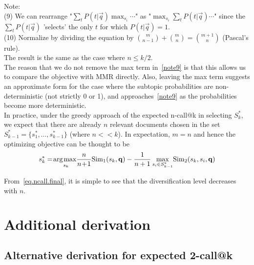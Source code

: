\noindent
Note: \\
(9) We can rearrange "$\sum_t P(t|\vec{q}) \max_{s_i} \cdots$" as "$\max_{s_i} \sum_t P(t|\vec{q}) \cdots$" since the $\sum_t P(t|\vec{q})$ 'selects' the only $t$ for which $P(t|\vec{q}) = 1$. \\
(10) Normalize by dividing the equation by $\binom{m}{n-1} + \binom{m}{n} = \binom{m+1}{n}$ (Pascal's rule). \\
The result is the same as the case where $n \leq k/2$. \\

The reason that we do not remove the max term in~\eqref{note9} is that this allows us to compare the objective with MMR directly. Also, leaving the max term suggests an approximate form for the case where the subtopic probabilities are non-deterministic (not strictly 0 or 1), and approaches~\eqref{note9} as the probabilities become more deterministic. \\

In practice, under the greedy approach of the expected n-call@k in selecting $S_k^*$, we expect that there are already $n$ relevant documents chosen in the set $S_{k-1}^* = \{s_1^*, \dots, s_{k-1}^*\}$ (where $n << k$). In expectation, $m = n$ and hence the optimizing objective can be thought to be
\begin{align}
 s_k^* = \argmax_{s_k} \!\! \frac{n}{n\!+\!1} \Sim_1(s_k,\vec{q}) - \frac{1}{n+1} \max_{s_i \in S_{k-1}^*} \! \Sim_2(s_k,s_i,\vec{q}) \label{eq.ncall.final}
\end{align} 

From~\eqref{eq.ncall.final}, it is simple to see that the diversification level decreases with $n$.

\section{Additional derivation}
\subsection{Alternative derivation for expected 2-call@k}

